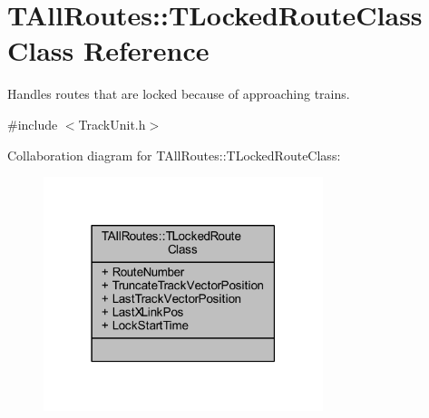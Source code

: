 \hypertarget{class_t_all_routes_1_1_t_locked_route_class}{}\section{T\+All\+Routes\+:\+:T\+Locked\+Route\+Class Class Reference}
\label{class_t_all_routes_1_1_t_locked_route_class}


Handles routes that are locked because of approaching trains.  




{\ttfamily \#include $<$Track\+Unit.\+h$>$}



Collaboration diagram for T\+All\+Routes\+:\+:T\+Locked\+Route\+Class\+:\nopagebreak
\begin{figure}[H]
\begin{center}
\leavevmode
\includegraphics[width=231pt]{class_t_all_routes_1_1_t_locked_route_class__coll__graph}
\end{center}
\end{figure}
